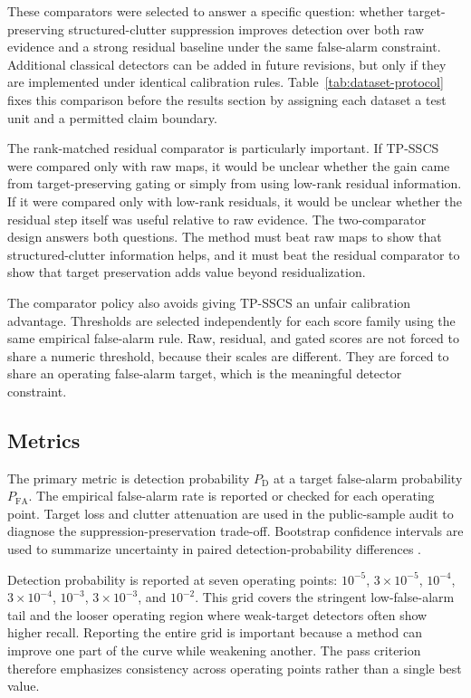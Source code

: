 \documentclass[journal]{IEEEtran}
\begin{document}
These comparators were selected to answer a specific question: whether target-preserving structured-clutter suppression improves detection over both raw evidence and a strong residual baseline under the same false-alarm constraint. Additional classical detectors can be added in future revisions, but only if they are implemented under identical calibration rules. Table~\ref{tab:dataset-protocol} fixes this comparison before the results section by assigning each dataset a test unit and a permitted claim boundary.

The rank-matched residual comparator is particularly important. If TP-SSCS were compared only with raw maps, it would be unclear whether the gain came from target-preserving gating or simply from using low-rank residual information. If it were compared only with low-rank residuals, it would be unclear whether the residual step itself was useful relative to raw evidence. The two-comparator design answers both questions. The method must beat raw maps to show that structured-clutter information helps, and it must beat the residual comparator to show that target preservation adds value beyond residualization.

The comparator policy also avoids giving TP-SSCS an unfair calibration advantage. Thresholds are selected independently for each score family using the same empirical false-alarm rule. Raw, residual, and gated scores are not forced to share a numeric threshold, because their scales are different. They are forced to share an operating false-alarm target, which is the meaningful detector constraint.

\subsection{Metrics}

The primary metric is detection probability $P_{\mathrm{D}}$ at a target false-alarm probability $P_{\mathrm{FA}}$. The empirical false-alarm rate is reported or checked for each operating point. Target loss and clutter attenuation are used in the public-sample audit to diagnose the suppression-preservation trade-off. Bootstrap confidence intervals are used to summarize uncertainty in paired detection-probability differences \cite{efron1979bootstrap}.

Detection probability is reported at seven operating points: $10^{-5}$, $3\times10^{-5}$, $10^{-4}$, $3\times10^{-4}$, $10^{-3}$, $3\times10^{-3}$, and $10^{-2}$. This grid covers the stringent low-false-alarm tail and the looser operating region where weak-target detectors often show higher recall. Reporting the entire grid is important because a method can improve one part of the curve while weakening another. The pass criterion therefore emphasizes consistency across operating points rather than a single best value.
\end{document}
